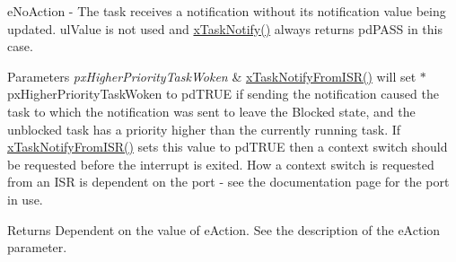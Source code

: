 e\+No\+Action -\/ The task receives a notification without its notification value being updated. ul\+Value is not used and \hyperlink{externals_2freertos_2include_2task_8h_a0d2d54fb8a64011dfbb54983e4ed06bd}{x\+Task\+Notify()} always returns pd\+P\+A\+SS in this case.


\begin{DoxyParams}{Parameters}
{\em px\+Higher\+Priority\+Task\+Woken} & \hyperlink{externals_2freertos_2include_2task_8h_a1ed9129068b96a909356bd0369c5ecb0}{x\+Task\+Notify\+From\+I\+S\+R()} will set $\ast$px\+Higher\+Priority\+Task\+Woken to pd\+T\+R\+UE if sending the notification caused the task to which the notification was sent to leave the Blocked state, and the unblocked task has a priority higher than the currently running task. If \hyperlink{externals_2freertos_2include_2task_8h_a1ed9129068b96a909356bd0369c5ecb0}{x\+Task\+Notify\+From\+I\+S\+R()} sets this value to pd\+T\+R\+UE then a context switch should be requested before the interrupt is exited. How a context switch is requested from an I\+SR is dependent on the port -\/ see the documentation page for the port in use.\\
\hline
\end{DoxyParams}
\begin{DoxyReturn}{Returns}
Dependent on the value of e\+Action. See the description of the e\+Action parameter. 
\end{DoxyReturn}

